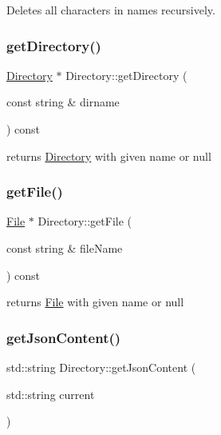 Deletes all characters in names recursively. 

\mbox{\label{class_directory_a1deb0931a93badb556a4faed75cbc033}} 
\subsubsection{\texorpdfstring{get\+Directory()}{getDirectory()}}
{\footnotesize\ttfamily \hyperlink{class_directory}{Directory} $\ast$ Directory\+::get\+Directory (\begin{DoxyParamCaption}\item[{const string \&}]{dirname }\end{DoxyParamCaption}) const}



returns \hyperlink{class_directory}{Directory} with given name or null 

\mbox{\label{class_directory_a3a7c1f0d955b7c3a73f6701db1fdf72b}} 
\subsubsection{\texorpdfstring{get\+File()}{getFile()}}
{\footnotesize\ttfamily \hyperlink{class_file}{File} $\ast$ Directory\+::get\+File (\begin{DoxyParamCaption}\item[{const string \&}]{file\+Name }\end{DoxyParamCaption}) const}



returns \hyperlink{class_file}{File} with given name or null 

\mbox{\label{class_directory_ad4b9f8d48a33526ac1c61dbce3753f1d}} 
\subsubsection{\texorpdfstring{get\+Json\+Content()}{getJsonContent()}}
{\footnotesize\ttfamily std\+::string Directory\+::get\+Json\+Content (\begin{DoxyParamCaption}\item[{std\+::string}]{current }\end{DoxyParamCaption})}



